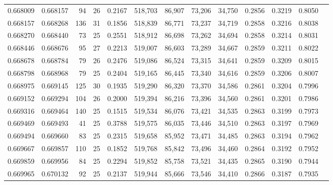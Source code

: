 \begin{tabular}{rrrrrrrrrrrrr}
0.668009 & 0.668157 &    94 &  26 &                                     0.2167 & 518,703 &  86,907 &  73,206 &  34,750 & 0.2856 & 0.3219 & 0.8050 \\
0.668157 & 0.668268 &   136 &  31 &                                     0.1856 & 518,839 &  86,771 &  73,237 &  34,719 & 0.2858 & 0.3216 & 0.8038 \\
0.668270 & 0.668440 &    73 &  25 &                                     0.2551 & 518,912 &  86,698 &  73,262 &  34,694 & 0.2858 & 0.3214 & 0.8031 \\
0.668446 & 0.668676 &    95 &  27 &                                     0.2213 & 519,007 &  86,603 &  73,289 &  34,667 & 0.2859 & 0.3211 & 0.8022 \\
0.668678 & 0.668784 &    79 &  26 &                                     0.2476 & 519,086 &  86,524 &  73,315 &  34,641 & 0.2859 & 0.3209 & 0.8015 \\
0.668798 & 0.668968 &    79 &  25 &                                     0.2404 & 519,165 &  86,445 &  73,340 &  34,616 & 0.2859 & 0.3206 & 0.8007 \\
0.668975 & 0.669145 &   125 &  30 &                                     0.1935 & 519,290 &  86,320 &  73,370 &  34,586 & 0.2861 & 0.3204 & 0.7996 \\
0.669152 & 0.669294 &   104 &  26 &                                     0.2000 & 519,394 &  86,216 &  73,396 &  34,560 & 0.2861 & 0.3201 & 0.7986 \\
0.669316 & 0.669464 &   140 &  25 &                                     0.1515 & 519,534 &  86,076 &  73,421 &  34,535 & 0.2863 & 0.3199 & 0.7973 \\
0.669469 & 0.669493 &    41 &  25 &                                     0.3788 & 519,575 &  86,035 &  73,446 &  34,510 & 0.2863 & 0.3197 & 0.7969 \\
0.669494 & 0.669660 &    83 &  25 &                                     0.2315 & 519,658 &  85,952 &  73,471 &  34,485 & 0.2863 & 0.3194 & 0.7962 \\
0.669667 & 0.669857 &   110 &  25 &                                     0.1852 & 519,768 &  85,842 &  73,496 &  34,460 & 0.2864 & 0.3192 & 0.7952 \\
0.669859 & 0.669956 &    84 &  25 &                                     0.2294 & 519,852 &  85,758 &  73,521 &  34,435 & 0.2865 & 0.3190 & 0.7944 \\
0.669965 & 0.670132 &    92 &  25 &                                     0.2137 & 519,944 &  85,666 &  73,546 &  34,410 & 0.2866 & 0.3187 & 0.7935 \\

\end{tabular}
